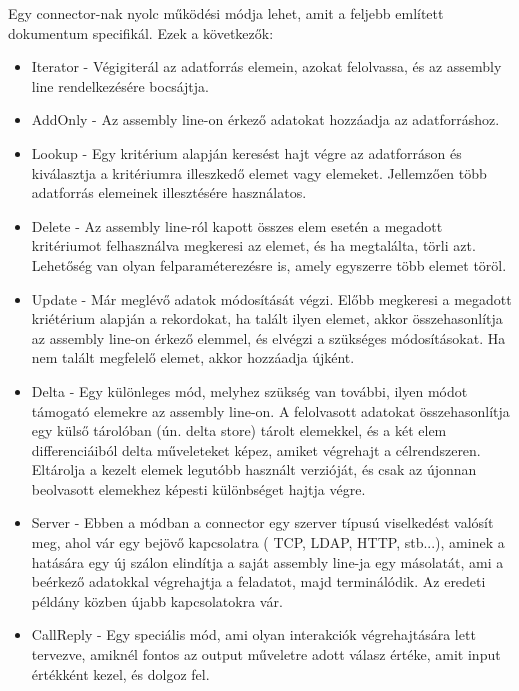 Egy connector-nak nyolc működési módja lehet, amit a feljebb említett dokumentum specifikál. Ezek a következők:


\begin{itemize}
	\item Iterator - Végigiterál az adatforrás elemein, azokat felolvassa, és az assembly line rendelkezésére bocsájtja.
	
	\item AddOnly - Az assembly line-on érkező adatokat hozzáadja az adatforráshoz.
	
	\item Lookup - Egy kritérium alapján keresést hajt végre az adatforráson és kiválasztja a kritériumra illeszkedő elemet vagy elemeket. Jellemzően több adatforrás elemeinek illesztésére használatos.
	
	\item Delete - Az assembly line-ról kapott összes elem esetén a megadott kritériumot felhasználva megkeresi az elemet, és ha megtalálta, törli azt. Lehetőség van olyan felparaméterezésre is, amely egyszerre több elemet töröl.
	
	\item Update - Már meglévő adatok módosítását végzi. Előbb  megkeresi a megadott kriétérium alapján a rekordokat, ha talált ilyen elemet, akkor összehasonlítja az assembly line-on érkező elemmel, és elvégzi a szükséges módosításokat. Ha nem talált megfelelő elemet, akkor hozzáadja újként.
	
	\item Delta - Egy különleges mód, melyhez szükség van további, ilyen módot támogató elemekre az assembly line-on. A felolvasott adatokat összehasonlítja egy külső tárolóban (ún. delta store) tárolt elemekkel, és a két elem differenciáiból delta műveleteket képez, amiket végrehajt a célrendszeren. Eltárolja a kezelt elemek legutóbb használt verzióját, és csak az újonnan beolvasott elemekhez képesti különbséget hajtja végre.
	
	\item Server - Ebben a módban a connector egy szerver típusú viselkedést valósít meg, ahol vár egy bejövő kapcsolatra ( TCP, LDAP, HTTP, stb...), aminek a hatására egy új szálon elindítja a saját assembly line-ja egy másolatát, ami a beérkező adatokkal végrehajtja a feladatot, majd terminálódik. Az eredeti példány közben újabb kapcsolatokra vár.
	
	\item CallReply - Egy speciális mód, ami olyan interakciók végrehajtására lett tervezve, amiknél fontos az output műveletre adott válasz értéke, amit input értékként kezel, és dolgoz fel.
\end{itemize}

